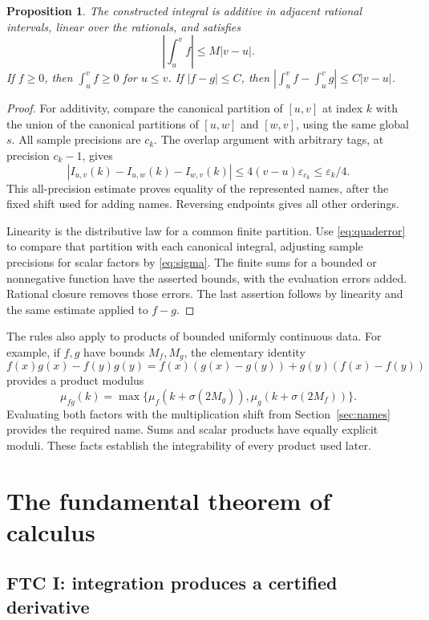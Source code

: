 \documentclass[11pt]{article}
\newtheorem{proposition}[theorem]{Proposition}
\theoremstyle{definition}
\newcommand{\eps}{\varepsilon}
\newcommand{\abs}[1]{\left|#1\right|}
\begin{document}
\begin{proposition}\label{prop:integralrules}
The constructed integral is additive in adjacent rational intervals,
linear over the rationals, and satisfies
\[
 \abs{\int_u^v f}\le M\abs{v-u}.
\]
If \(f\ge0\), then \(\int_u^v f\ge0\) for \(u\le v\).
If \(\abs{f-g}\le C\), then
\(\abs{\int_u^v f-\int_u^v g}\le C\abs{v-u}\).
\end{proposition}
\begin{proof}
For additivity, compare the canonical partition of \([u,v]\) at index
\(k\) with the union of the canonical partitions of \([u,w]\) and
\([w,v]\), using the same global \(s\).  All sample precisions are
\(c_k\).  The overlap argument with arbitrary tags, at precision
\(c_k-1\), gives
\begin{equation}
 \abs{I_{u,v}(k)-I_{u,w}(k)-I_{w,v}(k)}
 \le4(v-u)\eps_{c_k}\le\eps_k/4.\label{eq:addfinite}
\end{equation}
This all-precision estimate proves equality of the represented names,
after the fixed shift used for adding names.  Reversing endpoints gives
all other orderings.

Linearity is the distributive law for a common finite partition.  Use
\eqref{eq:quaderror} to compare that partition with each canonical
integral, adjusting sample precisions for scalar factors by
\eqref{eq:sigma}.  The finite sums for a bounded or nonnegative
function have the asserted bounds, with the evaluation errors added.
Rational closure removes those errors.  The last assertion follows by
linearity and the same estimate applied to \(f-g\).
\end{proof}

The rules also apply to products of bounded uniformly continuous data.
For example, if \(f,g\) have bounds \(M_f,M_g\), the elementary identity
\[
 f(x)g(x)-f(y)g(y)
 =f(x)(g(x)-g(y))+g(y)(f(x)-f(y))
\]
provides a product modulus
\[
 \mu_{fg}(k)=\max\{\mu_f(k+\sigma(2M_g)),
                       \mu_g(k+\sigma(2M_f))\}.
\]
Evaluating both factors with the multiplication shift from
Section~\ref{sec:names} provides the required name.  Sums and scalar
products have equally explicit moduli.  These facts establish the
integrability of every product used later.

\section{The fundamental theorem of calculus}\label{sec:FTC}

\subsection{FTC I: integration produces a certified derivative}
\end{document}
